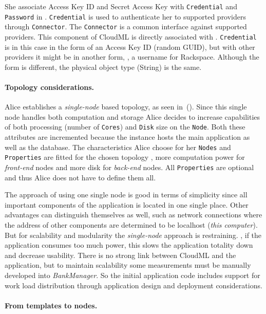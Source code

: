 She associate Access Key ID and Secret Access Key with 
\texttt{Credential} and \texttt{Password} in .
\texttt{Credential} is used to authenticate her to supported providers through \texttt{Connector}.
The \texttt{Connector} is a common interface against supported providers.
This component of CloudML is directly associated with .
\texttt{Credential} is in this case in the form of an Access Key ID (random GUID),
but with other providers it might be in another form, \eg, a username for Rackspace.
Although the form is different, the physical object type (String) is the same.

\paragraph{Topology considerations.}

Alice establishes a \emph{single-node} based topology, as seen in~().
Since this single node handles both computation and storage Alice decides to 
increase capabilities of both processing (number of \texttt{Cores}) and 
\texttt{Disk} size on the \texttt{Node}.
Both these attributes are incremented because the instance hosts
the main application as well as the database.
The characteristics Alice choose for her \texttt{Nodes} and \texttt{Properties} are fitted
for the chosen topology \eg, more computation power for 
\emph{front-end} nodes and more disk for \emph{back-end} nodes.
All \texttt{Properties} are optional and thus Alice does not have to define them all.

The approach of using one single node is good in terms of simplicity since all important
components of the application is located in one single place.
Other advantages can distinguish themselves as well, such as network connections where
the address of other components are determined to be localhost (\emph{this computer}).
But for scalability and modularity the \emph{single-node} approach is restraining.
\eg, if the application consumes too much  power, 
this slows the application totality down and decrease usability.
There is no strong link between CloudML and the application, but to maintain
scalability some measurements must be manually developed into \emph{BankManager}.
So the initial application code includes support for work load distribution through 
application design and deployment considerations.

\paragraph{From templates to nodes.}

